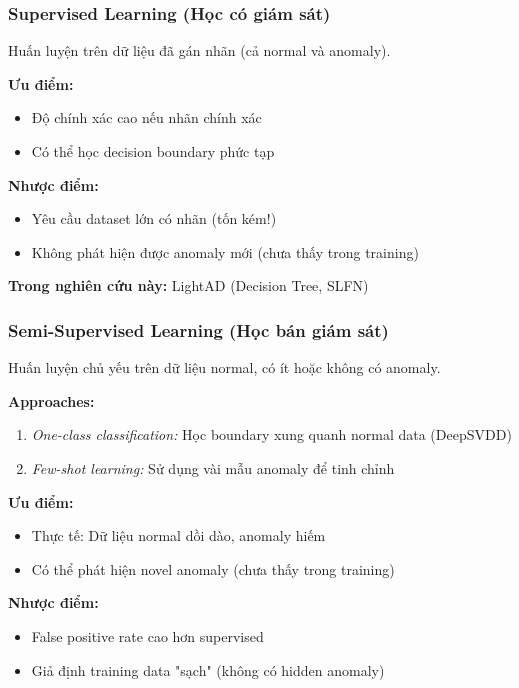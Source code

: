 \subsubsection{Supervised Learning (Học có giám sát)}

Huấn luyện trên dữ liệu đã gán nhãn (cả normal và anomaly).

\textbf{Ưu điểm:}
\begin{itemize}
    \item Độ chính xác cao nếu nhãn chính xác
    \item Có thể học decision boundary phức tạp
\end{itemize}

\textbf{Nhược điểm:}
\begin{itemize}
    \item Yêu cầu dataset lớn có nhãn (tốn kém!)
    \item Không phát hiện được anomaly mới (chưa thấy trong training)
\end{itemize}

\textbf{Trong nghiên cứu này:} LightAD (Decision Tree, SLFN)

\subsubsection{Semi-Supervised Learning (Học bán giám sát)}

Huấn luyện chủ yếu trên dữ liệu normal, có ít hoặc không có anomaly.

\textbf{Approaches:}
\begin{enumerate}
    \item \textit{One-class classification:} Học boundary xung quanh normal data (DeepSVDD)
    \item \textit{Few-shot learning:} Sử dụng vài mẫu anomaly để tinh chỉnh
\end{enumerate}

\textbf{Ưu điểm:}
\begin{itemize}
    \item Thực tế: Dữ liệu normal dồi dào, anomaly hiếm
    \item Có thể phát hiện novel anomaly (chưa thấy trong training)
\end{itemize}

\textbf{Nhược điểm:}
\begin{itemize}
    \item False positive rate cao hơn supervised
    \item Giả định training data "sạch" (không có hidden anomaly)
\end{itemize}

